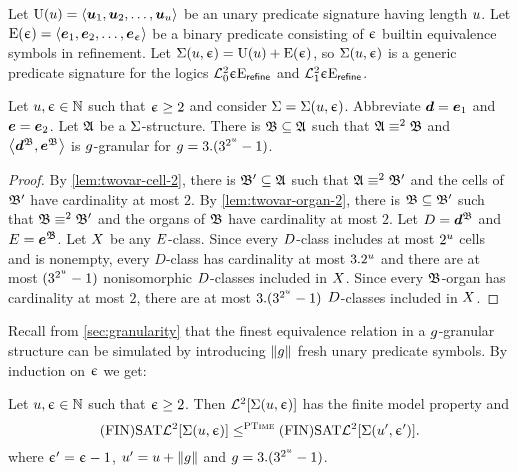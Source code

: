 
Let $\mathrm{U}(u) = \left\langle \bm{u}_{1},\bm{u}_{2},\dots,\bm{u}_{u} \right\rangle$ be an unary predicate
signature having length $u$.
Let $\mathrm{E}(\upepsilon) = \left\langle \bm{e}_{1},\bm{e}_{2},\dots,\bm{e}_{\upepsilon} \right\rangle$ be a binary predicate
consisting of $\upepsilon$ builtin equivalence symbols in refinement.
Let $\mathrm{\Sigma}(u,\upepsilon) = \mathrm{U}(u) + \mathrm{E}(\upepsilon)$, so $\mathrm{\Sigma}(u,\upepsilon)$ is a generic
predicate signature for the logics $\mathcal{L}^{2}_{0}{\upepsilon}\mathrm{E}_{\mathsf{refine}}$ and
$\mathcal{L}^{2}_{1}{\upepsilon}\mathrm{E}_{\mathsf{refine}}$.

\begin{remark}\label{rem:twovar-granular}
Let $u, \upepsilon \in \mathbb{N}$ such that $\upepsilon \geq 2$ and consider
$\mathrm{\Sigma} = \mathrm{\Sigma}(u,\upepsilon)$.
Abbreviate $\bm{d} = \bm{e}_{1}$ and $\bm{e} = \bm{e}_{2}$.
Let $\mathfrak{A}$ be a $\mathrm{\Sigma}$-structure.
There is $\mathfrak{B} \subseteq \mathfrak{A}$ such that
$\mathfrak{A} \equiv^{2} \mathfrak{B}$ and $\left\langle \bm{d}^{\mathfrak{B}},\bm{e}^{\mathfrak{B}} \right\rangle$ is $g$-granular
for $g = 3.(3^{2^u}-1)$.
\end{remark}
\begin{proof}
By \cref{lem:twovar-cell-2}, there is $\mathfrak{B'} \subseteq \mathfrak{A}$ such that
$\mathfrak{A} \equiv^{2} \mathfrak{B'}$ and the cells of $\mathfrak{B'}$ have cardinality at most $2$.
By \cref{lem:twovar-organ-2}, there is $\mathfrak{B} \subseteq \mathfrak{B'}$ such that
$\mathfrak{B} \equiv^{2} \mathfrak{B'}$ and the organs of $\mathfrak{B}$ have cardinality at most $2$.
Let $D = \bm{d}^{\mathfrak{B}}$ and $E = \bm{e}^{\mathfrak{B}}$.
Let $X$ be any $E$-class.
Since every $D$-class includes at most $2^u$ cells and is nonempty, every
$D$-class has cardinality at most $3.2^u$ and there are at most
$(3^{2^u}-1)$ nonisomorphic $D$-classes included in $X$.
Since every $\mathfrak{B}$-organ has cardinality at most $2$, there are at most
$3.(3^{2^u}-1)$ $D$-classes included in $X$.
\end{proof}
Recall from \cref{sec:granularity} that the finest equivalence relation in a
$g$-granular structure can be simulated by introducing $\|g\|$ fresh unary
predicate symbols.
By induction on $\upepsilon$ we get:
\begin{corollary}\label{cor:twovar-sub-1}
Let $u,\upepsilon \in \mathbb{N}$ such that $\upepsilon \geq 2$.
Then $\mathcal{L}^{2}[\mathrm{\Sigma}(u,\upepsilon)]$ has the finite model property and
\[
  \mathrm{(FIN)SAT}\mathcal{L}^{2}[\mathrm{\Sigma}(u,\upepsilon)] \leq^{\text{\normalfont{\scshape PTime}}}
  \mathrm{(FIN)SAT}\mathcal{L}^{2}[\mathrm{\Sigma}({u'},{\upepsilon'})].
\]
where ${\upepsilon'} = \upepsilon - 1$, ${u'} = u + \|g\|$ and
$g = 3.(3^{2^u} - 1)$.
\end{corollary}

